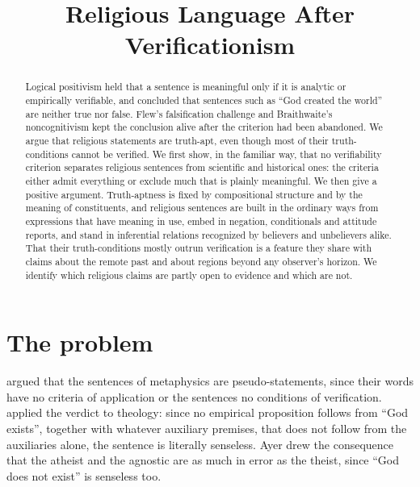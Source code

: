 \documentclass{situationist-preprint}
\title{Religious Language After Verificationism}
\begin{document}
\maketitle

\begin{abstract}
Logical positivism held that a sentence is meaningful only if it is analytic or empirically verifiable, and concluded that sentences such as \enquote{God created the world} are neither true nor false. Flew's falsification challenge and Braithwaite's noncognitivism kept the conclusion alive after the criterion had been abandoned. We argue that religious statements are truth-apt, even though most of their truth-conditions cannot be verified. We first show, in the familiar way, that no verifiability criterion separates religious sentences from scientific and historical ones: the criteria either admit everything or exclude much that is plainly meaningful. We then give a positive argument. Truth-aptness is fixed by compositional structure and by the meaning of constituents, and religious sentences are built in the ordinary ways from expressions that have meaning in use, embed in negation, conditionals and attitude reports, and stand in inferential relations recognized by believers and unbelievers alike. That their truth-conditions mostly outrun verification is a feature they share with claims about the remote past and about regions beyond any observer's horizon. We identify which religious claims are partly open to evidence and which are not.
\end{abstract}

\section{The problem}

\citet{Carnap1932} argued that the sentences of metaphysics are pseudo-statements, since their words have no criteria of application or the sentences no conditions of verification. \citet[ch.~6]{Ayer1936} applied the verdict to theology: since no empirical proposition follows from \enquote{God exists}, together with whatever auxiliary premises, that does not follow from the auxiliaries alone, the sentence is literally senseless. Ayer drew the consequence that the atheist and the agnostic are as much in error as the theist, since \enquote{God does not exist} is senseless too.
\end{document}
